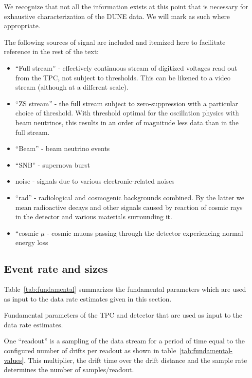We recognize that not all the information exists at this point that is
necessary for exhaustive characterization of the DUNE data.
We will mark as such where appropriate.


The following sources of signal are included and itemized here to
facilitate reference in the rest of the text:
\begin{itemize}
\item ``Full stream'' - effectively continuous stream of digitized
  voltages read out from the TPC, not subject to thresholds.
  This can be likened to a video stream (although at a different
  scale).
\item ``ZS stream'' - the full stream subject to zero-suppression with
  a particular choice of threshold.
  With threshold optimal for the oscillation physics with beam
  neutrinos, this results in an order of magnitude less data than in
  the full stream.
\item ``Beam'' - beam neutrino events
\item ``SNB'' - supernova burst
\item noise - signals due to various electronic-related noises
\item ``rad'' - radiological and cosmogenic backgrounds combined.
  By the latter we mean radioactive decays and other signals caused by
  reaction of cosmic rays in the detector and various materials
  surrounding it.
\item ``cosmic $\mu$ - cosmic muons passing through the detector
  experiencing normal energy loss
\end{itemize}

\subsection{Event rate and sizes}

Table~\ref{tab:fundamental} summarizes the fundamental parameters
which are used as input to the data rate estimates given in this
section.

\begin{table}[htbp]
  \centering
  \caption{Fundamental parameters of the TPC and detector that are used as input to the data rate estimates.}
%  
  \label{tab:fundamental}
\end{table}

One ``readout'' is a sampling of the data stream for a period of time
equal to the configured number of drifts per readout as shown in
table~\ref{tab:fundamental-values}.
This multiplier, the drift time over the drift distance and the sample
rate determines the number of samples/readout.


